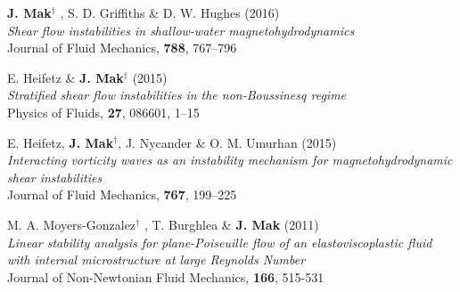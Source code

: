 \documentclass[letterpaper]{article}
\renewenvironment{itemize}{
  \begin{list}{}{
    \setlength{\leftmargin}{1.5em}
  }
}{
  \end{list}
}
\begin{document}
\begin{itemize}
\item[4.] \textbf{J. Mak}$^{\dagger}$ , S. D. Griffiths \& D. W. Hughes
(2016)\\
\textit{Shear flow instabilities in shallow-water magnetohydrodynamics}\\
Journal of Fluid Mechanics, \textbf{788}, 767--796

\item[3.] E. Heifetz \& \textbf{J. Mak}$^{\dagger}$ (2015)\\
\textit{Stratified shear flow instabilities in the non-Boussinesq regime}\\
Physics of Fluids, \textbf{27}, 086601, 1--15

\item[2.] E. Heifetz, \textbf{J. Mak}$^{\dagger}$, J. Nycander \& O. M.
Umurhan (2015)\\
\textit{Interacting vorticity waves as an instability mechanism for
magnetohydrodynamic shear instabilities}\\
Journal of Fluid Mechanics, \textbf{767}, 199--225

\item[1.] M. A. Moyers-Gonzalez$^{\dagger}$ , T. Burghlea \& \textbf{J. Mak}
(2011)\\
\textit{Linear stability analysis for plane-Poiseuille flow of an
elastoviscoplastic fluid with internal microstructure at large Reynolds
Number}\\
Journal of Non-Newtonian Fluid Mechanics, \textbf{166}, 515-531
\end{itemize}
\end{document}
